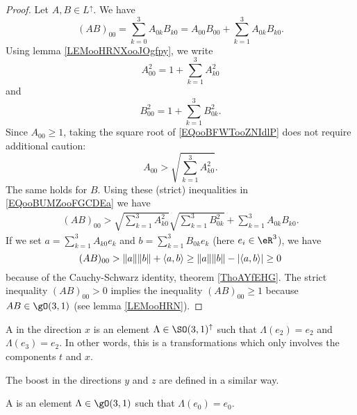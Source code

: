 \begin{proof}
    Let \( A,B\in L^{\uparrow}\). We have
    \begin{equation}        \label{EQooBUMZooFGCDEa}
        (AB)_{00}=\sum_{k=0}^3A_{0k}B_{k0}=A_{00}B_{00}+\sum_{k=1}^3A_{0k}B_{k0}.
    \end{equation}
    Using lemma \ref{LEMooHRNXooJOgfpy}, we write
    \begin{equation}        \label{EQooBFWTooZNIdlP}
        A_{00}^2=1+\sum_{k=1}^3A_{k0}^2
    \end{equation}
    and
    \begin{equation}
        B_{00}^2=1+\sum_{k=1}^3B_{0k}^2.
    \end{equation}
    Since \( A_{00}\geq 1\), taking the square root of \eqref{EQooBFWTooZNIdlP} does not require additional caution:
    \begin{equation}
        A_{00}>\sqrt{ \sum_{k=1}^3A_{k0}^2 }.
    \end{equation}
    The same holds for \( B\). Using these (strict) inequalities in \eqref{EQooBUMZooFGCDEa} we have
    \begin{subequations}
        \begin{align}
            (AB)_{00}>\sqrt{ \sum_{k=1}^3A_{k0}^2 }\sqrt{ \sum_{k=1}^3B_{0k}^2 }+\sum_{k=1}^3A_{0k}B_{k0}.
        \end{align}
    \end{subequations}
    If we set \( a=\sum_{k=1}^3A_{k0}e_k\) and \( b=\sum_{k=1}^3B_{0k}e_k\) (here \( e_i\in \eR^3\)), we have
    \begin{equation}
        (AB)_{00}>\| a \|\| b \|+\langle a, b\rangle \\
        \geq \| a \|\| b \|-| \langle a, b\rangle  |\\
        \geq 0
    \end{equation}
    because of the Cauchy-Schwarz identity, theorem \ref{ThoAYfEHG}. The strict inequality \( (AB)_{00}>0\) implies the inequality \( (AB)_{00}\geq 1\) because \( AB\in \gO(3,1)\) (see lemma \ref{LEMooHRN}).
\end{proof}

\begin{definition}
    A  in the direction \( x\) is an element \( \Lambda\in \SO(3,1)^{\uparrow}\) such that \( \Lambda(e_2)=e_2\) and \( \Lambda(e_3)=e_2\). In other words, this is a transformations which only involves the components \( t\) and \( x\).

    The boost in the directions \( y\) and \( z\) are defined in a similar way.

    A  is an element \( \Lambda\in \gO(3,1)\) such that \( \Lambda(e_0)=e_0\).
\end{definition}

